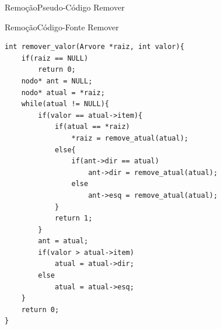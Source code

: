\documentclass[aspectratio=169]{beamer}
\begin{document}
\begin{frame}{Remoção}{Pseudo-Código Remover}
\end{frame}


\begin{frame}[fragile]{Remoção}{Código-Fonte Remover}
\begin{lstlisting}[style=CStyle,basicstyle=\tiny]
int remover_valor(Arvore *raiz, int valor){
    if(raiz == NULL)
        return 0;
    nodo* ant = NULL;
    nodo* atual = *raiz;
    while(atual != NULL){
        if(valor == atual->item){
            if(atual == *raiz)
                *raiz = remove_atual(atual);
            else{
                if(ant->dir == atual)
                    ant->dir = remove_atual(atual);
                else
                    ant->esq = remove_atual(atual);
            }
            return 1;
        }
        ant = atual;
        if(valor > atual->item)
            atual = atual->dir;
        else
            atual = atual->esq;
    }
    return 0;
}
\end{lstlisting}  
\end{frame}


\end{document}
